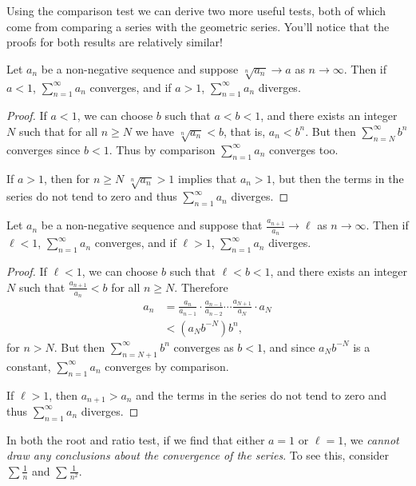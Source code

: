 \documentclass[a4paper]{scrartcl}
\begin{document}
Using the comparison test we can derive two more useful tests, both of which come from comparing a series with the geometric series. You'll notice that the proofs for both results are relatively similar!

\begin{theorem}
	Let $a_n$ be a non-negative sequence and suppose $\sqrt[n]{a_n} \rightarrow a$ as $n \rightarrow \infty$.
	Then if $a < 1$, $\sum_{n = 1}^{\infty} a_n$ converges, and if $a > 1$, $\sum_{n = 1}^{\infty} a_n$ diverges.
\end{theorem}
\begin{proof}
	If $a < 1$, we can choose $b$ such that $a < b < 1$, and there exists an integer $N$ such that for all $n \geq N$ we have $\sqrt[n]{a_n} < b$, that is, $a_n < b^n$. But then $\sum_{n = N}^{\infty} b^n$ converges since $b < 1$. Thus by comparison $\sum_{n = 1}^{\infty} a_n$ converges too.

	If $a > 1$, then for $n \geq N$ $\sqrt[n]{a_n} > 1$ implies that $a_n > 1$, but then the terms in the series do not tend to zero and thus $\sum_{n = 1}^{\infty} a_n$ diverges.
\end{proof}


\begin{theorem}
	Let $a_n$ be a non-negative sequence and suppose that $\frac{a_{n + 1}}{a_n} \rightarrow \ell$ as $n \rightarrow \infty$. Then if $\ell < 1$, $\sum_{n = 1}^{\infty} a_n$ converges, and if $\ell > 1$, $\sum_{n = 1}^{\infty} a_n$ diverges.
\end{theorem}
\begin{proof}
	If $\ell < 1$, we can choose $b$ such that $\ell < b < 1$, and there exists an integer $N$ such that $\frac{a_{n + 1}}{a_n} < b$ for all $n \geq N$. Therefore
	\begin{align*}
		a_n &= \frac{a_n}{a_{n - 1}} \cdot \frac{a_{n - 1}}{a_{n - 2}} \cdots \frac{a_{N + 1}}{a_{N}}\cdot a_N \\
		&< \left(a_N b^{-N}\right)b^{n},
	\end{align*}
	for $n > N$. But then $\sum_{n = N+1}^{\infty} b^n$ converges as $b < 1$, and since $a_N b^{-N}$ is a constant, $\sum_{n = 1}^{\infty} a_n$ converges by comparison.

	If $\ell > 1$, then $a_{n + 1} > a_n$ and the terms in the series do not tend to zero and thus $\sum_{n = 1}^{\infty} a_n$ diverges. 
\end{proof}
\begin{remark}
	In both the root and ratio test, if we find that either $a = 1$ or $\ell = 1$, we \emph{cannot draw any conclusions about the convergence of the series}. To see this, consider $\sum \frac{1}{n}$ and $\sum \frac{1}{n^2}$.
\end{remark}
\end{document}

